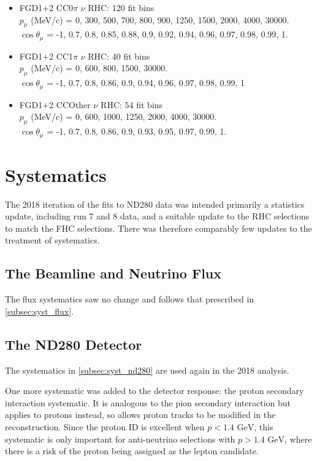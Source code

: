 \begin{itemize}
	\item FGD1+2 CC0$\pi$ $\nu$ RHC: 120 fit bins \\
	$p_\mu$ (MeV/c) = 0, 300, 500, 700, 800, 900, 1250, 1500, 2000, 4000, 30000.\\
	$\cos\theta_\mu$ = -1, 0.7, 0.8, 0.85, 0.88, 0.9, 0.92, 0.94, 0.96, 0.97, 0.98, 0.99, 1.
	
	\item FGD1+2 CC1$\pi$ $\nu$ RHC: 40 fit bins \\
	$p_\mu$ (MeV/c) = 0, 600, 800, 1500, 30000.\\
	$\cos\theta_\mu$ = -1, 0.7, 0.8, 0.86, 0.9, 0.94, 0.96, 0.97, 0.98, 0.99, 1
	
	\item FGD1+2 CCOther $\nu$ RHC: 54 fit bins \\
	$p_\mu$ (MeV/c) = 0, 600, 1000, 1250, 2000, 4000, 30000.\\
	$\cos\theta_\mu$ = -1, 0.7, 0.8, 0.86, 0.9, 0.93, 0.95, 0.97, 0.99, 1.
\end{itemize}

\section{Systematics}
\label{sec:syst_2018}
The 2018 iteration of the fits to ND280 data was intended primarily a statistics update, including run 7 and 8 data, and a suitable update to the RHC selections to match the FHC selections. There was therefore comparably few updates to the treatment of systematics.

\subsection{The Beamline and Neutrino Flux}
The flux systematics saw no change and follows that prescribed in \autoref{subsec:syst_flux}.

\subsection{The ND280 Detector}
The systematics in \autoref{subsec:syst_nd280} are used again in the 2018 analysis. 

One more systematic was added to the detector response: the proton secondary interaction systematic. It is analogous to the pion secondary interaction but applies to protons instead, so allows proton tracks to be modified in the reconstruction. Since the proton ID is excellent when $p < 1.4\text{ GeV}$, this systematic is only important for anti-neutrino selections with $p > 1.4\text{ GeV}$, where there is a risk of the proton being assigned as the lepton candidate.

